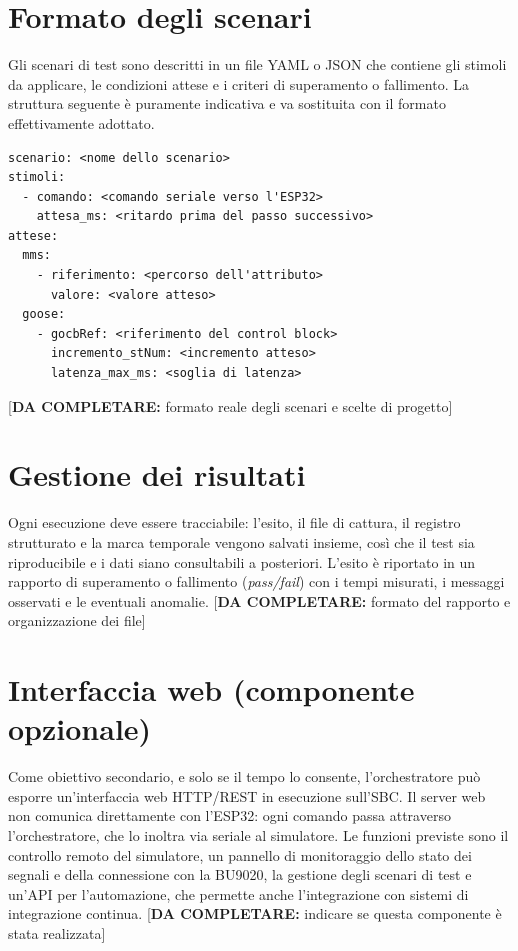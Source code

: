 \documentclass[11pt,a4paper,italian,oneside,openany]{book}
\newcommand{\daf}[1]{{\color{red}[\textbf{DA COMPLETARE:} #1]}}
\begin{document}
\section{Formato degli scenari}
Gli scenari di test sono descritti in un file YAML o JSON che contiene gli stimoli da applicare, le condizioni attese e i criteri di superamento o fallimento. La struttura seguente è puramente indicativa e va sostituita con il formato effettivamente adottato.
\begin{lstlisting}
scenario: <nome dello scenario>
stimoli:
  - comando: <comando seriale verso l'ESP32>
    attesa_ms: <ritardo prima del passo successivo>
attese:
  mms:
    - riferimento: <percorso dell'attributo>
      valore: <valore atteso>
  goose:
    - gocbRef: <riferimento del control block>
      incremento_stNum: <incremento atteso>
      latenza_max_ms: <soglia di latenza>
\end{lstlisting}
\daf{formato reale degli scenari e scelte di progetto}

\section{Gestione dei risultati}
Ogni esecuzione deve essere tracciabile: l'esito, il file di cattura, il registro strutturato e la marca temporale vengono salvati insieme, così che il test sia riproducibile e i dati siano consultabili a posteriori. L'esito è riportato in un rapporto di superamento o fallimento (\textit{pass/fail}) con i tempi misurati, i messaggi osservati e le eventuali anomalie. \daf{formato del rapporto e organizzazione dei file}

\section{Interfaccia web (componente opzionale)}
Come obiettivo secondario, e solo se il tempo lo consente, l'orchestratore può esporre un'interfaccia web HTTP/REST in esecuzione sull'SBC. Il server web non comunica direttamente con l'ESP32: ogni comando passa attraverso l'orchestratore, che lo inoltra via seriale al simulatore. Le funzioni previste sono il controllo remoto del simulatore, un pannello di monitoraggio dello stato dei segnali e della connessione con la BU9020, la gestione degli scenari di test e un'API per l'automazione, che permette anche l'integrazione con sistemi di integrazione continua. \daf{indicare se questa componente è stata realizzata}

\end{document}
